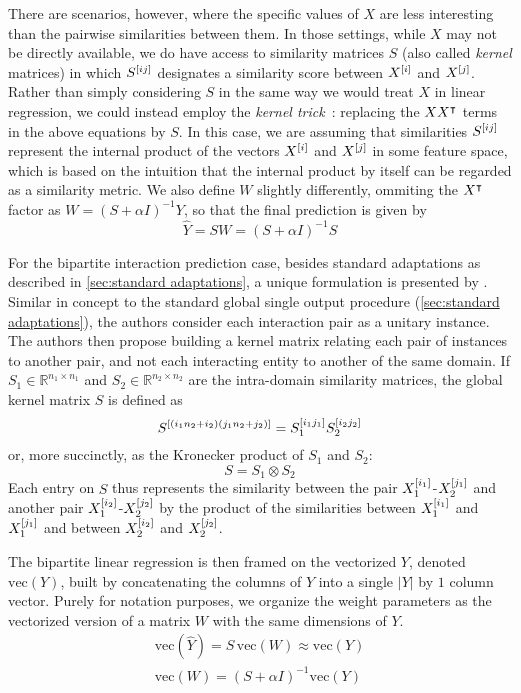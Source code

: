 \begin{apendicesenv}
There are scenarios, however, where the specific values of $X$ are less interesting than the pairwise similarities between them. In those settings, while $X$ may not be directly available, we do have access to similarity matrices $S$ (also called \emph{kernel} matrices) in which $S^{[ij]}$ designates a similarity score between $X^{[i]}$ and $X^{[j]}$. Rather than simply considering $S$ in the same way we would treat $X$ in linear regression, we could instead employ the \emph{kernel trick}~\cite{murphy2012machine}: replacing the $XX^\intercal$ terms in the above equations by $S$. In this case, we are assuming that similarities $S^{[ij]}$ represent the internal product of the vectors $X^{[i]}$ and $X^{[j]}$ in some feature space, which is based on the intuition that the internal product by itself can be regarded as a similarity metric.
%
We also define $W$ slightly differently, ommiting the $X^\intercal$ factor as $W = (S + \alpha I)^{-1} Y$, so that the final prediction is given by
%
\begin{equation}
    \hat Y = S W = (S + \alpha I)^{-1} S
\end{equation}

For the bipartite interaction prediction case, besides standard adaptations as described in \autoref{sec:standard adaptations}, a unique formulation is presented by . Similar in concept to the standard global single output procedure (\autoref{sec:standard adaptations}), the authors consider each interaction pair as a unitary instance. The authors then propose building a kernel matrix relating each pair of instances to another pair, and not each interacting entity to another of the same domain. If $S_1 \in \mathbb{R}^{n_1 \times n_1}$ and $S_2 \in \mathbb{R}^{n_2 \times n_2}$ are the intra-domain similarity matrices, the global kernel matrix $S$ is defined as
%
\begin{equation}
    S^{[(i_1n_2 + i_2)(j_1 n_2 + j_2)]} = S_1^{[i_1j_1]} S_2^{[i_2j_2]}
\end{equation}
%
or, more succinctly, as the Kronecker product of $S_1$ and $S_2$:
%
\begin{equation}
    S = S_1 \otimes S_2
\end{equation}
%
Each entry on $S$ thus represents the similarity between the pair $X_1^{[i_1]}$-$X_2^{[j_1]}$ and another pair $X_1^{[i_2]}$-$X_2^{[j_2]}$ by the product of the similarities between $X_1^{[i_1]}$ and $X_1^{[j_1]}$ and between $X_2^{[i_2]}$ and $X_2^{[j_2]}$.

The bipartite linear regression is then framed on the vectorized $Y$, denoted $\text{vec}(Y)$, built by concatenating the columns of $Y$ into a single $|Y|$ by $1$ column vector.
Purely for notation purposes, we organize the weight parameters as the vectorized version of a matrix $W$ with the same dimensions of $Y$.
%
\begin{gather}
    \text{vec}(\hat Y) = S\,\text{vec}(W) \approx \text{vec}(Y)
    \\
    \text{vec}(W) = (S + \alpha I)^{-1} \text{vec}(Y)
\end{gather}


\end{apendicesenv}
